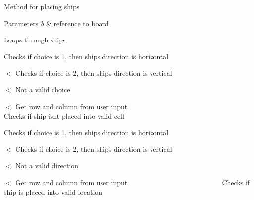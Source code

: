 Method for placing ships 
\begin{DoxyParams}{Parameters}
{\em b} & reference to board \\
\hline
\end{DoxyParams}
Loops through ships

Checks if choice is 1, then ship\textquotesingle{}s direction is horizontal

$<$ Checks if choice is 2, then ship\textquotesingle{}s direction is vertical

$<$ Not a valid choice

$<$ Get row and column from user input ~\newline
~\newline
~\newline
~\newline
~\newline
~\newline
~\newline
~\newline
~\newline
~\newline
~\newline
~\newline
~\newline
~\newline
~\newline
~\newline
~\newline
~\newline
~\newline
~\newline
~\newline
 Checks if ship isn\textquotesingle{}t placed into valid cell

Checks if choice is 1, then ship\textquotesingle{}s direction is horizontal

$<$ Checks if choice is 2, then ship\textquotesingle{}s direction is vertical

$<$ Not a valid direction

$<$ Get row and column from user input ~\newline
~\newline
~\newline
~\newline
~\newline
~\newline
~\newline
~\newline
~\newline
~\newline
~\newline
~\newline
~\newline
~\newline
~\newline
~\newline
 Checks if ship is placed into valid location

